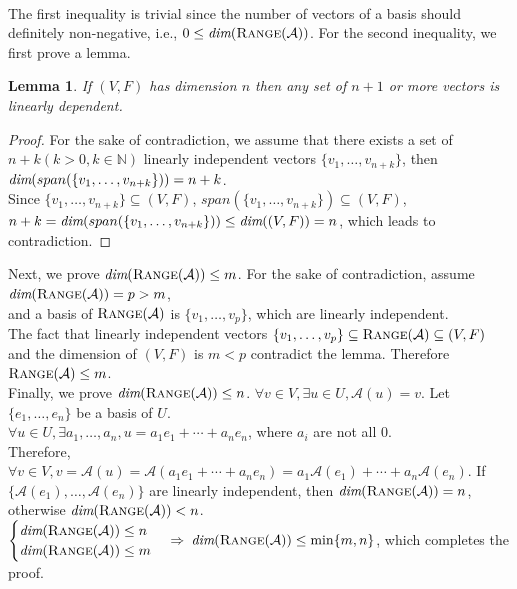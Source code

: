 \documentclass[a4paper,10.5pt]{article}
\def\dim{{\mbox{\em dim}}}
\def\range{{\mbox{\sc Range}}}
\newtheorem{lemma}{Lemma}
\newtheorem{proof}{Proof}
\newcommand{\N}{\mathbb{N}}
\newcommand{\A}{\mathcal{A}}
\begin{document}
 \\
The first inequality is trivial since the number of vectors of a basis should definitely non-negative, i.e., $0 \leq \dim(\range(\mathcal{A}))$. For the second inequality, we first prove a lemma.
\begin{lemma}
	If $(V,F)$ has dimension $n$ then any set of $n+1$ or more vectors is linearly dependent.
\end{lemma}
\begin{proof}
	For the sake of contradiction, we assume that there exists a set of $n+k\left(k>0, k \in \N\right)$ linearly independent vectors $\{v_1, \dots,v_{n+k}\}$, then $\dim(span(\{v_1, \dots,v_{n+k}\}))=n+k$. \\
	Since $\{v_1, \dots,v_{n+k}\} \subseteq (V,F)$, $span(\{v_1, \dots,v_{n+k}\}) \subseteq (V,F)$, \\
	$n+k = \dim(span(\{v_1, \dots,v_{n+k}\})) \leq \dim((V,F)) = n$, which leads to contradiction.
\end{proof}
Next, we prove $\dim(\range(\A)) \leq m$. For the sake of contradiction, assume $\dim(\range(\A)) = p > m$, \\
and a basis of $\range(\A)$ is $\{v_1,\dots,v_p\}$, which are linearly independent. \\
The fact that linearly independent vectors $\{v_1,\dots,v_p\} \subseteq \range(\A) \subseteq (V,F)$ and the dimension of $(V,F)$ is $m<p$ contradict the lemma. Therefore $\range(\A) \leq m$. \\
Finally, we prove $\dim(\range(\A)) \leq n$. $\forall v \in V, \exists u \in U, \A(u)=v$. Let $\{e_1,\dots,e_n\}$ be a basis of $U$. \\
$\forall u \in U, \exists a_1, \dots, a_n, u = a_1 e_1 + \cdots + a_n e_n$, where $a_i$ are not all $0$. \\
Therefore, $\forall v \in V, v = \A (u) = \A \left(a_1 e_1 + \cdots + a_n e_n\right) = a_1 \A(e_1) + \cdots + a_n \A(e_n)$. If $\{\A(e_1), \dots, \A(e_n)\}$ are linearly independent, then $\dim(\range(\A)) = n$, otherwise $\dim(\range(\A)) < n$. \\
$\begin{cases}
\dim(\range(\A)) \leq n \\
\dim(\range(\A)) \leq m
\end{cases} \Rightarrow$ $\dim(\range(\A)) \leq \min \{m,n\}$, which completes the proof. \\
\ \\
\end{document}
